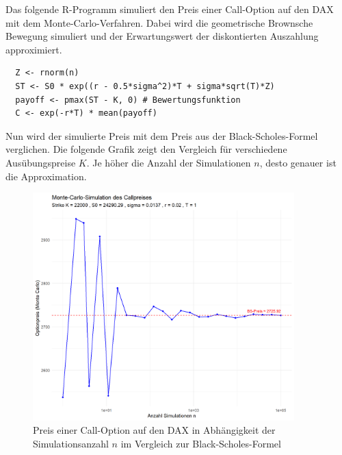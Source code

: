 \begin{bsp}

Das folgende R-Programm simuliert den Preis einer Call-Option auf den DAX
mit dem Monte-Carlo-Verfahren. Dabei wird die geometrische Brownsche Bewegung
simuliert und der Erwartungswert der diskontierten Auszahlung approximiert.

\begin{lstlisting}
  Z <- rnorm(n)
  ST <- S0 * exp((r - 0.5*sigma^2)*T + sigma*sqrt(T)*Z)
  payoff <- pmax(ST - K, 0) # Bewertungsfunktion
  C <- exp(-r*T) * mean(payoff)
\end{lstlisting}
Nun wird der simulierte Preis mit dem Preis aus der Black-Scholes-Formel verglichen. 
Die folgende Grafik zeigt den Vergleich für verschiedene Ausübungspreise $K$.
Je höher die Anzahl der Simulationen $n$, desto genauer ist die Approximation.

\begin{figure}[H]
    \centering
    \includegraphics[width=0.9\textwidth]{images/call_dax_mc.png}
    \caption{Preis einer Call-Option auf den DAX in Abhängigkeit der Simulationsanzahl $n$ im Vergleich zur Black-Scholes-Formel}
    \label{fig:call_dax_mc}
\end{figure}

\end{bsp}

